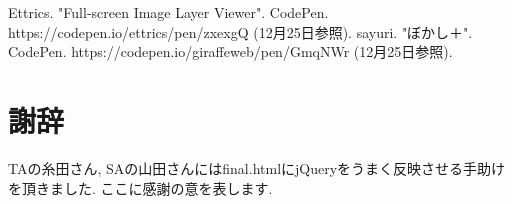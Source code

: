 \documentclass{jarticle}
\begin{document}
\begin{thebibliography}{2}
	 Ettrics. "Full-screen Image Layer Viewer". CodePen. https://codepen.io/ettrics/pen/zxexgQ (12月25日参照).
	sayuri. "ぼかし＋". CodePen. https://codepen.io/giraffeweb/pen/GmqNWr (12月25日参照). 
\end{thebibliography}


\section*{謝辞}
TAの糸田さん, SAの山田さんにはfinal.htmlにjQueryをうまく反映させる手助けを頂きました. ここに感謝の意を表します. 
\end{document}
